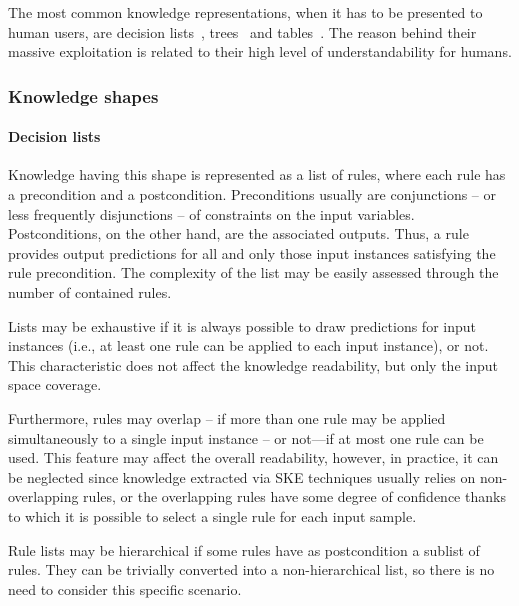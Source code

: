 \documentclass[sigconf]{acmart}
\begin{document}
The most common knowledge representations, when it has to be presented to human users, are decision lists~\cite{freitas2014comprehensible,huysmans2011empirical}, trees~\cite{quinlan1993c4,breiman1984classification} and tables~\cite{sethi2012kdruleex}.
%
The reason behind their massive exploitation is related to their high level of understandability for humans.

\subsubsection{Knowledge shapes}

\paragraph{Decision lists}

Knowledge having this shape is represented as a list of rules, where each rule has a precondition and a postcondition.
%
Preconditions usually are conjunctions -- or less frequently disjunctions -- of constraints on the input variables.
%
Postconditions, on the other hand, are the associated outputs.
%
Thus, a rule provides output predictions for all and only those input instances satisfying the rule precondition.
%
The complexity of the list may be easily assessed through the number of contained rules.

Lists may be exhaustive if it is always possible to draw predictions for input instances (i.e., at least one rule can be applied to each input instance), or not.
%
This characteristic does not affect the knowledge readability, but only the input space coverage.

Furthermore, rules may overlap -- if more than one rule may be applied simultaneously to a single input instance -- or not---if at most one rule can be used.
%
This feature may affect the overall readability, however, in practice, it can be neglected since knowledge extracted via SKE techniques usually relies on non-overlapping rules, or the overlapping rules have some degree of confidence thanks to which it is possible to select a single rule for each input sample.

Rule lists may be hierarchical if some rules have as postcondition a sublist of rules.
%
They can be trivially converted into a non-hierarchical list, so there is no need to consider this specific scenario.
\end{document}
